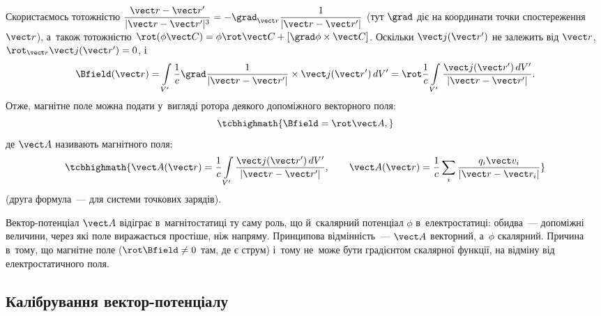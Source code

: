 Скористаємось тотожністю $\dfrac{\vect r - \vect r'}{|\vect r-\vect r'|^3} = -\grad_{\vect
		r} \dfrac1{|\vect r - \vect r'|}$ (тут $\grad$ діє на координати точки спостереження
$\vect r$), а~також тотожністю $\rot(\phi\vect C) = \phi\rot\vect C +
	\left[\grad\phi\times\vect C\right]$. Оскільки $\vect j(\vect r')$ не залежить від $\vect
	r$, $\rot_{\vect r}\vect j(\vect r') = 0$, і
\begin{equation*}
	\Bfield(\vect r) = \int\limits_{V'} \frac1c \grad\frac1{|\vect r-\vect r'|}\times\vect j(\vect r')\, dV' = \rot\frac1c\int\limits_{V'}
	\frac{\vect j(\vect r')\, dV'}{|\vect r-\vect r'|}.
\end{equation*}
Отже, магнітне поле можна подати у~вигляді ротора деякого допоміжного векторного поля:
\begin{equation}\label{eq:BrotA}
	\tcbhighmath{
		\Bfield = \rot\vect A,
	}
\end{equation}
де $\vect A$ називають  магнітного поля:
\begin{equation}\label{eq:VectorPotentialDef}
	\tcbhighmath{
		\vect A(\vect r) = \frac1c\int\limits_{V'} \frac{\vect j(\vect r')\, dV'}{|\vect r-\vect r'|}, \qquad \vect A(\vect r) = \frac1c
		\sum\limits_i \frac{q_i\vect v_i}{|\vect r - \vect r_i|}
	}
\end{equation}
(друга формула~--- для системи точкових зарядів).

Вектор-потенціал $\vect A$ відіграє в~магнітостатиці ту саму роль, що й~скалярний
потенціал $\phi$ в~електростатиці: обидва~--- допоміжні величини, через які поле
виражається простіше, ніж напряму. Принципова відмінність~--- $\vect A$ векторний,
а~$\phi$ скалярний. Причина в~тому, що магнітне поле  ($\rot\Bfield\neq0$ там,
де є струм) і~тому не~може бути градієнтом скалярної функції, на відміну від
 електростатичного поля.


\subsection*{Калібрування вектор-потенціалу}


